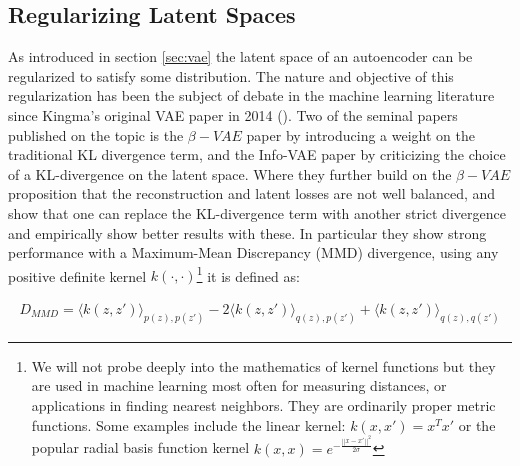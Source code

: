 \subsection{Regularizing Latent Spaces}\label{sec:latent}

As introduced in section \ref{sec:vae} the latent space of an autoencoder can be regularized to satisfy some distribution. The nature and objective of this regularization has been the subject of debate in the machine learning literature since Kingma's original VAE paper in 2014 (\cite{Kingma2013}). Two of the seminal papers published on the topic is the $\beta-VAE$ paper by \citet{Higgins2017} introducing a weight on the traditional KL divergence term, and the Info-VAE paper by \citet{Zhao} criticizing the choice of a KL-divergence on the latent space. Where they further build on the $\beta-VAE$ proposition that the reconstruction and latent losses are not well balanced, and show that one can replace the KL-divergence term with another strict divergence and empirically show better results with these. In particular they show strong performance with a Maximum-Mean Discrepancy (MMD) divergence, using any positive definite kernel $k(\cdot, \cdot)$\footnote{We will not probe deeply into the mathematics of kernel functions but they are used in machine learning most often for measuring distances, or applications in finding nearest neighbors. They are ordinarily proper metric functions. Some examples include the linear kernel: $k(x, x') = x^Tx'$ or the popular radial basis function kernel $k(x, x)=e^{-\frac{||x - x'||^2}{2\sigma}}$} it is defined as:  

\begin{align}
D_{MMD} = \langle k(z, z')\rangle_{p(z), p(z')} - 2 \langle k(z, z')\rangle_{q(z), p(z')} + \langle k(z, z')\rangle_{q(z), q(z')}
\end{align}